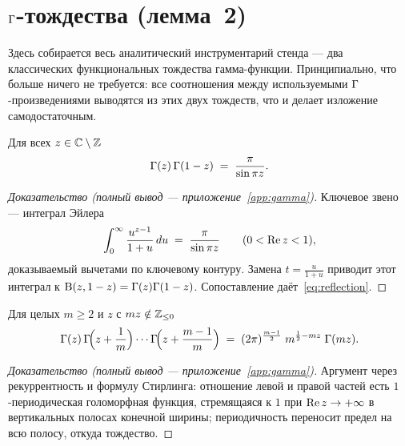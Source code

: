 \section{$\Gamma$-тождества (лемма~2)}\label{sec:gammaid}

Здесь собирается весь аналитический инструментарий стенда --- два
классических функциональных тождества гамма-функции. Принципиально,
что больше ничего не требуется: все соотношения между используемыми
$\Gamma$-произведениями выводятся из этих двух тождеств, что и делает
изложение самодостаточным.

\begin{lemma}\label{lem:reflection}
Для всех $z\in\mathbb{C}\setminus\mathbb{Z}$
\begin{equation}\label{eq:reflection}
  \Gamma(z)\,\Gamma(1-z)\;=\;\frac{\pi}{\sin \pi z}.
\end{equation}
\end{lemma}

\begin{proof}[Доказательство (полный вывод --- приложение~\ref{app:gamma})]
Ключевое звено --- интеграл Эйлера
\[
  \int_0^\infty \frac{u^{z-1}}{1+u}\,du \;=\; \frac{\pi}{\sin\pi z}
  \qquad (0<\operatorname{Re} z<1),
\]
доказываемый вычетами по ключевому контуру. Замена
$t=\frac{u}{1+u}$ приводит этот интеграл к
$\mathrm{B}(z,1-z)=\Gamma(z)\Gamma(1-z)$. Сопоставление даёт~\eqref{eq:reflection}.
\end{proof}

\begin{lemma}\label{lem:gauss}
Для целых $m\ge2$ и $z$ с $mz\notin\mathbb{Z}_{\le0}$
\begin{equation}\label{eq:gauss}
  \Gamma(z)\,\Gamma\!\Bigl(z+\frac1m\Bigr)\cdots
  \Gamma\!\Bigl(z+\frac{m-1}{m}\Bigr)
  \;=\;(2\pi)^{\frac{m-1}{2}}\;m^{\frac12-mz}\;\Gamma(mz).
\end{equation}
\end{lemma}

\begin{proof}[Доказательство (полный вывод --- приложение~\ref{app:gamma})]
Аргумент через рекуррентность и формулу Стирлинга: отношение левой и
правой частей есть $1$-периодическая голоморфная функция, стремящаяся
к $1$ при $\operatorname{Re} z\to+\infty$ в вертикальных полосах конечной ширины;
периодичность переносит предел на всю полосу, откуда тождество.
\end{proof}

